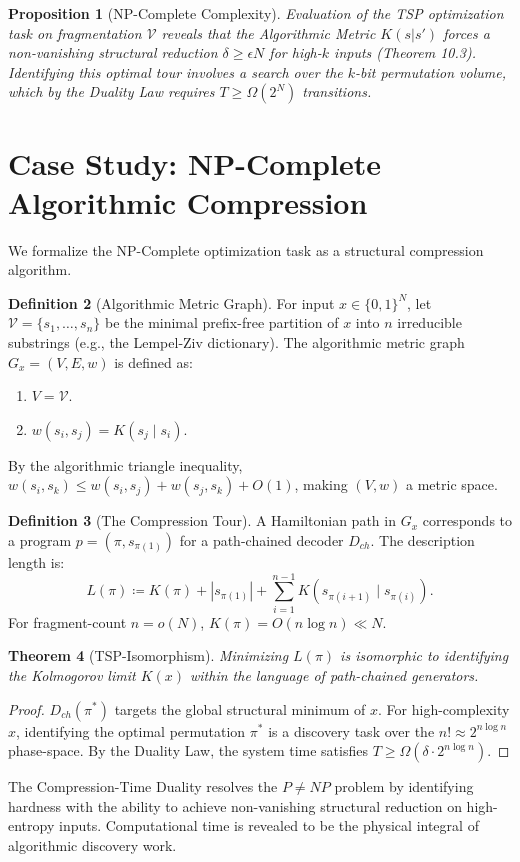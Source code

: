 \documentclass[12pt,a4paper]{article}
\theoremstyle{plain}
\newtheorem{theorem}{Theorem}[section]
\newtheorem{proposition}[theorem]{Proposition}
\theoremstyle{definition}
\newtheorem{definition}[theorem]{Definition}
\begin{document}
\begin{proposition}[NP-Complete Complexity]
Evaluation of the TSP optimization task on fragmentation $\mathcal{V}$ reveals that the Algorithmic Metric $K(s|s')$ forces a non-vanishing structural reduction $\delta \ge \epsilon N$ for high-$k$ inputs (Theorem 10.3). Identifying this optimal tour involves a search over the $k$-bit permutation volume, which by the Duality Law requires $T \ge \Omega(2^N)$ transitions.
\end{proposition}

\section{Case Study: NP-Complete Algorithmic Compression}

We formalize the NP-Complete optimization task as a structural compression algorithm.

\begin{definition}[Algorithmic Metric Graph]
For input $x \in \{0,1\}^N$, let $\mathcal{V} = \{s_1, \dots, s_n\}$ be the minimal prefix-free partition of $x$ into $n$ irreducible substrings (e.g., the Lempel-Ziv dictionary). The algorithmic metric graph $G_x = (V, E, w)$ is defined as:
\begin{enumerate}
    \item $V = \mathcal{V}$.
    \item $w(s_i, s_j) = K(s_j \mid s_i)$.
\end{enumerate}
By the algorithmic triangle inequality, $w(s_i, s_k) \le w(s_i, s_j) + w(s_j, s_k) + O(1)$, making $(V, w)$ a metric space.
\end{definition}

\begin{definition}[The Compression Tour]
A Hamiltonian path in $G_x$ corresponds to a program $p = (\pi, s_{\pi(1)})$ for a path-chained decoder $D_{ch}$. The description length is:
\begin{equation}
L(\pi) \coloneqq K(\pi) + |s_{\pi(1)}| + \sum_{i=1}^{n-1} K(s_{\pi(i+1)} \mid s_{\pi(i)}).
\end{equation}
For fragment-count $n = o(N)$, $K(\pi) = O(n \log n) \ll N$.
\end{definition}

\begin{theorem}[TSP-Isomorphism]
Minimizing $L(\pi)$ is isomorphic to identifying the Kolmogorov limit $K(x)$ within the language of path-chained generators.
\end{theorem}
\begin{proof}
$D_{ch}(\pi^*)$ targets the global structural minimum of $x$. For high-complexity $x$, identifying the optimal permutation $\pi^*$ is a discovery task over the $n! \approx 2^{n \log n}$ phase-space. By the Duality Law, the system time satisfies $T \ge \Omega(\delta \cdot 2^{n \log n})$.
\end{proof}

\begin{conclusion}
The Compression-Time Duality resolves the $P \neq NP$ problem by identifying hardness with the ability to achieve non-vanishing structural reduction on high-entropy inputs. Computational time is revealed to be the physical integral of algorithmic discovery work.
\end{conclusion}
\end{document}
